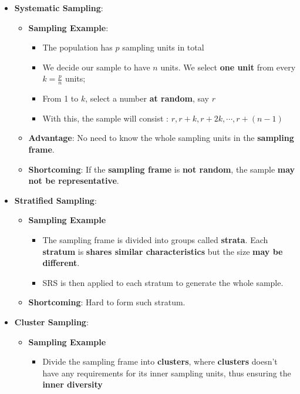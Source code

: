 \documentclass[10pt, landscape]{article}
\begin{document}
\begin{multicols}{4}
\begin{enumerate}
\begin{itemize}
        \item \textbf{Systematic Sampling}: 
        \begin{itemize}
            \item \textbf{Sampling Example}:
            \begin{itemize}
                \item The population has $p$ sampling units in total
                \item We decide our sample to have $n$ units. We select \textbf{one unit} from every $k=\frac{p}{n}$ units;
                \item From 1 to $k$, select a number \textbf{at random}, say $r$
                \item With this, the sample will consist : $r, r+k, r+2k, \cdots,r+(n-1)$
            \end{itemize}
            \item \textbf{Advantage}: No need to know the whole sampling units in the \textbf{sampling frame}.
            \item \textbf{Shortcoming}: If the \textbf{sampling frame} is \textbf{not random}, the sample \textbf{may not be representative}.
        \end{itemize}
        \item \textbf{Stratified Sampling}:
        \begin{itemize}
            \item \textbf{Sampling Example}
            \begin{itemize}
                \item The sampling frame is divided into groups called \textbf{strata}. Each \textbf{stratum} is \textbf{shares similar characteristics} but the size \textbf{may be different}.
                \item SRS is then applied to each stratum to generate the whole sample.
            \end{itemize}
        \item \textbf{Shortcoming}: Hard to form such stratum.
        \end{itemize}
        \item \textbf{Cluster Sampling}:
        \begin{itemize}
            \item \textbf{Sampling Example}
            \begin{itemize}
                \item Divide the sampling frame into \textbf{clusters}, where \textbf{clusters} doesn't have any requirements for its inner sampling units, thus ensuring the \textbf{inner diversity}

\end{itemize}
\end{itemize}
\end{itemize}
\end{enumerate}
\end{multicols}
\end{document}
